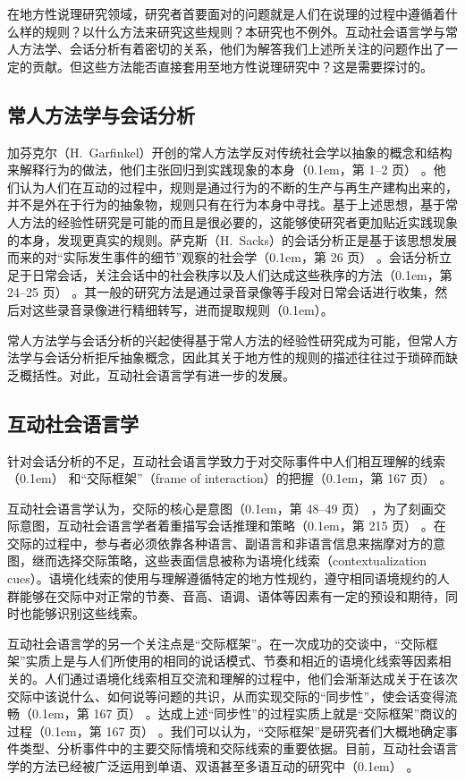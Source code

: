 \documentclass[b5paper,10.5pt,onecolumn,twoside,leqno,UTF8]{article}
\newcommand{\pcr}[1]{\raise0.1em\hbox{\parencite{#1}}}
\newcommand{\cpcr}[1]{（\pcr{#1}）}
\newcommand{\pc}[2]{（\pcr{#1}，第 #2 页）}
\begin{document}
在地方性说理研究领域，研究者首要面对的问题就是人们在说理的过程中遵循着什么样的规则？以什么方法来研究这些规则？本研究也不例外。互动社会语言学与常人方法学、会话分析有着密切的关系，他们为解答我们上述所关注的问题作出了一定的贡献。但这些方法能否直接套用至地方性说理研究中？这是需要探讨的。

\subsection{常人方法学与会话分析}

加芬克尔（H.~Garfinkel）开创的常人方法学反对传统社会学以抽象的概念和结构来解释行为的做法，他们主张回归到实践现象的本身\pc{gar}{1--2} 。他们认为人们在互动的过程中，规则是通过行为的不断的生产与再生产建构出来的，并不是外在于行为的抽象物，规则只有在行为本身中寻找。基于上述思想，基于常人方法的经验性研究是可能的而且是很必要的，这能够使研究者更加贴近实践现象的本身，发现更真实的规则。萨克斯（H.~Sacks）的会话分析正是基于该思想发展而来的对“实际发生事件的细节”观察的社会学\pc{sac}{26} 。会话分析立足于日常会话，关注会话中的社会秩序以及人们达成这些秩序的方法\pc{lyn}{24--25} 。其一般的研究方法是通过录音录像等手段对日常会话进行收集，然后对这些录音录像进行精细转写，进而提取规则\cpcr{yu}。

常人方法学与会话分析的兴起使得基于常人方法的经验性研究成为可能，但常人方法学与会话分析拒斥抽象概念，因此其关于地方性的规则的描述往往过于琐碎而缺乏概括性。对此，互动社会语言学有进一步的发展。

\subsection{互动社会语言学}

针对会话分析的不足，互动社会语言学致力于对交际事件中人们相互理解的线索\cpcr{gum4} 和“交际框架”（frame of interaction）的把握\pc{gum}{167} 。

互动社会语言学认为，交际的核心是意图\pc{zheng}{48--49} ，为了刻画交际意图，互动社会语言学者着重描写会话推理和策略\pc{gum3}{215} 。在交际的过程中，参与者必须依靠各种语言、副语言和非语言信息来揣摩对方的意图，继而选择交际策略，这些表面信息被称为语境化线索（contextualization cues）。语境化线索的使用与理解遵循特定的地方性规约，遵守相同语境规约的人群能够在交际中对正常的节奏、音高、语调、语体等因素有一定的预设和期待，同时也能够识别这些线索。

互动社会语言学的另一个关注点是“交际框架”。在一次成功的交谈中，“交际框架”实质上是与人们所使用的相同的说话模式、节奏和相近的语境化线索等因素相关的。人们通过语境化线索相互交流和理解的过程中，他们会渐渐达成关于在该次交际中该说什么、如何说等问题的共识，从而实现交际的“同步性”，使会话变得流畅\pc{gum}{167} 。达成上述“同步性”的过程实质上就是“交际框架”商议的过程\pc{gum}{167} 。我们可以认为，“交际框架”是研究者们大概地确定事件类型、分析事件中的主要交际情境和交际线索的重要依据。目前，互动社会语言学的方法已经被广泛运用到单语、双语甚至多语互动的研究中\cpcr{gum2} 。
\end{document}
